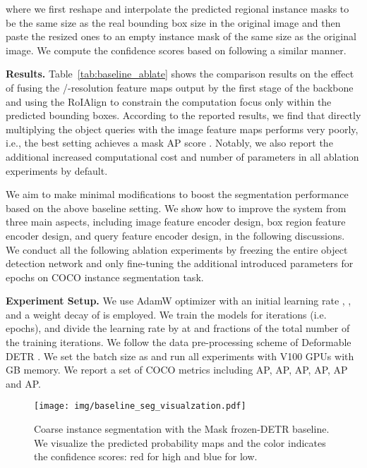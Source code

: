 \documentclass[10pt,twocolumn,letterpaper]{article}
\begin{document}
where we first reshape and interpolate the predicted regional instance masks to be the same size as the real bounding box size in the original image and then paste the resized ones to an empty instance mask of the same size as the original image.
We compute the confidence scores based on  following a similar manner.

\vspace{1mm}
\noindent\textbf{Results.}
Table~\ref{tab:baseline_ablate} shows the comparison results on the effect of fusing the /-resolution feature maps output by the first stage of the backbone and using the RoIAlign to constrain the computation focus only within the predicted bounding boxes.
According to the reported results,
we find that directly multiplying the object queries with the image feature maps performs very poorly, i.e., the best setting achieves a mask AP score .
Notably, we also report the additional increased computational cost and number of parameters in all ablation experiments by default.

We aim to make minimal modifications to boost the segmentation performance based on the above baseline setting.
We show how to improve the system from three main aspects, including image feature encoder design, box region feature encoder design, and query feature encoder design, in the following discussions.
{We conduct all the following ablation experiments by freezing the entire object detection network and only fine-tuning the additional introduced parameters for  epochs on COCO instance segmentation task.}

\noindent\textbf{Experiment Setup.}
We use AdamW optimizer with an initial learning rate , ,  and a weight decay of  is employed. We train the models for  iterations (i.e.  epochs), and divide the learning rate by  at  and  fractions of the total number of the training iterations.
We follow the data pre-processing scheme of Deformable DETR \cite{zhu2020deformable}. We set the batch size as  and run all experiments with V100 GPUs with GB memory.
We report a set of COCO metrics including AP, AP, AP, AP, AP and AP.


\begin{figure}[t]
\centering
\texttt{[image: img/baseline\_seg\_visualzation.pdf]}
\caption{\small{Coarse instance segmentation with the Mask frozen-DETR baseline. We visualize the predicted probability maps and the color indicates the confidence scores: red for high and blue for low.}}
\label{fig:baseline_seg}
\vspace{-3mm}
\end{figure}
\end{document}
